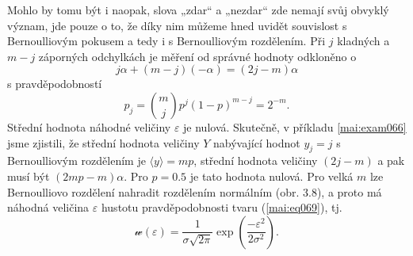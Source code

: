      
      Mohlo by tomu být i naopak, slova „zdar“ a „nezdar“ zde nemají svůj obvyklý význam, jde
      pouze o to, že díky nim můžeme hned uvidět souvislost s Bernoulliovým pokusem a tedy
      i s Bernoulliovým rozdělením. Při \(j\) kladných a \(m - j\) záporných odchylkách je měření od
      správné hodnoty odkloněno o
      \begin{equation*}
        j\alpha + (m - j)(-\alpha) = (2j - m)\alpha
      \end{equation*}
      s pravděpodobností
      \begin{equation*}
        p_j = \binom{m}{j}p^j(1 - p)^{m - j} = 2^{-m}.
      \end{equation*}
      Střední hodnota náhodné veličiny \(\varepsilon\) je nulová. Skutečně, v příkladu 
      \ref{mai:exam066} jsme zjistili, že střední hodnota veličiny \(Y\) nabývající hodnot \(y_j = 
      j\) s Bernoulliovým rozdělením je \(\langle y \rangle = mp\), střední hodnota veličiny \((2j 
      - m)\) a pak musí být \((2mp - m)\alpha\). Pro \(p = \num{0.5}\) je tato hodnota nulová.
      Pro velká \(m\) lze Bernoulliovo rozdělení nahradit rozdělením normálním (obr. 3.8), a proto 
      má náhodná veličina \(\varepsilon\) hustotu pravděpodobnosti tvaru (\ref{mai:eq069}), tj.
      \begin{equation*}
        \mathcal{w}(\varepsilon) = 
        \dfrac{1}{\sigma\sqrt{2\pi}}\exp\left(\dfrac{-\varepsilon^2}{2\sigma^2}\right).   
      \end{equation*}

    
